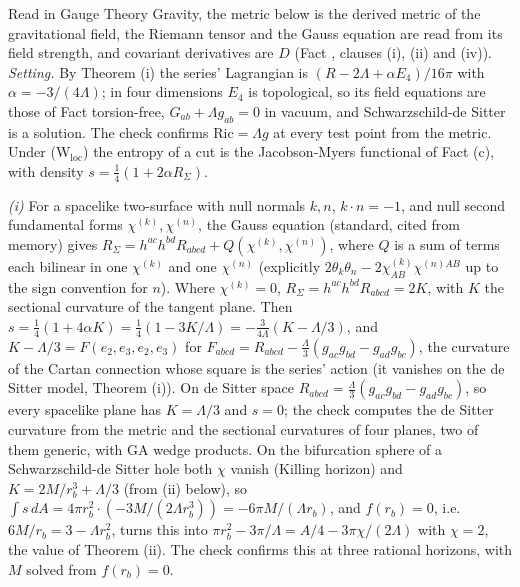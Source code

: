 Read in Gauge Theory Gravity, the metric below is the derived metric of the gravitational field, the Riemann tensor and the Gauss equation are read from its field strength, and covariant derivatives are $D$ (Fact , clauses (i), (ii) and (iv)). \emph{Setting.} By Theorem (i) the series' Lagrangian is $(R - 2\Lambda + \alpha E_{4})/16\pi$ with $\alpha = -3/(4\Lambda)$; in four dimensions $E_{4}$ is topological, so its field equations are those of Fact  torsion-free, $G_{ab} + \Lambda g_{ab} = 0$ in vacuum, and Schwarzschild-de Sitter is a solution. The check confirms $\mathrm{Ric} = \Lambda g$ at every test point from the metric. Under (W$_{\mathrm{loc}}$) the entropy of a cut is the Jacobson-Myers functional of Fact (c), with density $s = \tfrac14(1 + 2\alpha R_{\Sigma})$.

\emph{(i)} For a spacelike two-surface with null normals $k, n$, $k\cdot n = -1$, and null second fundamental forms $\chi^{(k)}, \chi^{(n)}$, the Gauss equation (standard, cited from memory) gives $R_{\Sigma} = h^{ac}h^{bd}R_{abcd} + Q(\chi^{(k)}, \chi^{(n)})$, where $Q$ is a sum of terms each bilinear in one $\chi^{(k)}$ and one $\chi^{(n)}$ (explicitly $2\theta_{k}\theta_{n} - 2\chi^{(k)}_{AB}\chi^{(n)AB}$ up to the sign convention for $n$). Where $\chi^{(k)} = 0$, $R_{\Sigma} = h^{ac}h^{bd}R_{abcd} = 2K$, with $K$ the sectional curvature of the tangent plane. Then $s = \tfrac14(1 + 4\alpha K) = \tfrac14(1 - 3K/\Lambda) = -\tfrac{3}{4\Lambda}(K - \Lambda/3)$, and $K - \Lambda/3 = F(e_{2}, e_{3}, e_{2}, e_{3})$ for $F_{abcd} = R_{abcd} - \tfrac{\Lambda}{3}(g_{ac}g_{bd} - g_{ad}g_{bc})$, the curvature of the Cartan connection whose square is the series' action (it vanishes on the de Sitter model, Theorem (i)). On de Sitter space $R_{abcd} = \tfrac{\Lambda}{3}(g_{ac}g_{bd} - g_{ad}g_{bc})$, so every spacelike plane has $K = \Lambda/3$ and $s = 0$; the check computes the de Sitter curvature from the metric and the sectional curvatures of four planes, two of them generic, with GA wedge products. On the bifurcation sphere of a Schwarzschild-de Sitter hole both $\chi$ vanish (Killing horizon) and $K = 2M/r_{b}^{3} + \Lambda/3$ (from (ii) below), so $\int s\,dA = 4\pi r_{b}^{2}\cdot(-3M/(2\Lambda r_{b}^{3})) = -6\pi M/(\Lambda r_{b})$, and $f(r_{b}) = 0$, i.e. $6M/r_{b} = 3 - \Lambda r_{b}^{2}$, turns this into $\pi r_{b}^{2} - 3\pi/\Lambda = A/4 - 3\pi\chi/(2\Lambda)$ with $\chi = 2$, the value of Theorem (ii). The check confirms this at three rational horizons, with $M$ solved from $f(r_{b}) = 0$.

